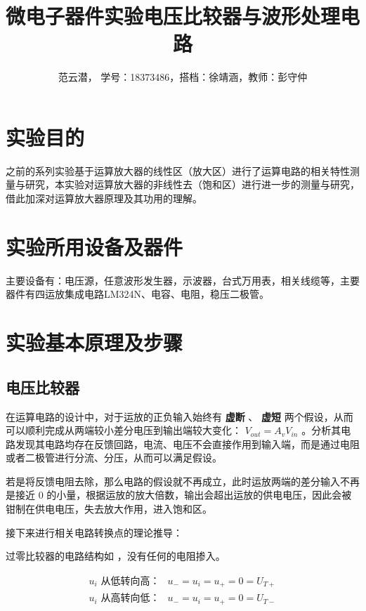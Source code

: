 \documentclass[lang=cn,11pt,a4paper,cite=authoryear]{elegantpaper}
\title{微电子器件实验\quad 电压比较器与波形处理电路}
\author{范云潜， 学号：18373486，搭档：徐靖涵，教师：彭守仲}
\institute{微电子学院 184111 班}
\date{\zhtoday}
\begin{document}
\maketitle


\section{实验目的}

之前的系列实验基于运算放大器的线性区（放大区）进行了运算电路的相关特性测量与研究，本实验对运算放大器的非线性去（饱和区）进行进一步的测量与研究，借此加深对运算放大器原理及其功用的理解。

\section{实验所用设备及器件}

主要设备有：电压源，任意波形发生器，示波器，台式万用表，相关线缆等，主要器件有四运放集成电路LM324N、电容、电阻，稳压二极管。

\section{实验基本原理及步骤}

\subsection{电压比较器}

在运算电路的设计中，对于运放的正负输入始终有 \textbf{虚断} 、 \textbf{虚短} 两个假设，从而可以顺利完成从两端较小差分电压到输出端较大变化： \(V_{out} = A_v V_{in}\) 。分析其电路发现其电路均存在反馈回路，电流、电压不会直接作用到输入端，而是通过电阻或者二极管进行分流、分压，从而可以满足假设。

若是将反馈电阻去除，那么电路的假设就不再成立，此时运放两端的差分输入不再是接近 \(0\) 的小量，根据运放的放大倍数，输出会超出运放的供电电压，因此会被钳制在供电电压，失去放大作用，进入饱和区。

接下来进行相关电路转换点的理论推导：

过零比较器的电路结构如  ，没有任何的电阻掺入。

\[
\begin{aligned}
    u_i \text{ 从低转向高：} & u_{-} = u_i = u_+ = 0 = U_{T+} \\ 
    u_i \text{ 从高转向低：} & u_{-} = u_i = u_+ = 0 = U_{T-} \\ 
\end{aligned}    
\]
\end{document}
